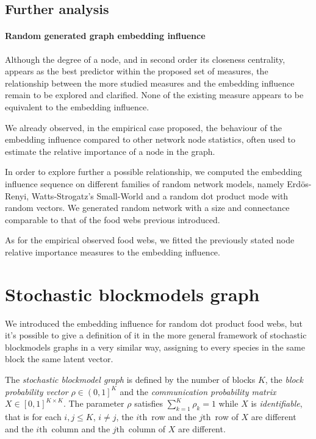 \documentclass[12pt]{article}
\theoremstyle{definition}
\begin{document}
\subsection{Further analysis}

\paragraph{Random generated graph embedding influence}
Although the degree of a node, and in second order its closeness centrality, appears as the best predictor within the proposed set of measures, the relationship between the more studied measures and the embedding influence remain to be explored and clarified. None of the existing measure appears to be equivalent to the embedding influence.

We already observed, in the empirical case proposed, the behaviour of the embedding influence compared to other network node statistics, often used to estimate the relative importance of a node in the graph.

In order to explore further a possible relationship, we computed the embedding influence sequence on different families of random network models, namely Erd\"{o}s-Renyi, Watts-Strogatz's Small-World and a random dot product mode with random vectors. We generated random network with a size and connectance comparable to that of the food webs previous introduced.

As for the empirical observed food webs, we fitted the previously stated node relative importance measures to the embedding influence.

\begin{small}


\end{small}

\newpage

\appendix

\section{Stochastic blockmodels graph}

We introduced the embedding influence for random dot product food webs, but it's possible to give a definition of it in the more general framework of stochastic blockmodels graphs in a very similar way, assigning to every species in the same block the same latent vector.

The {\em stochastic blockmodel graph} is defined by the number of blocks $K$, the {\em block probability vector} $\rho \in \left(0,1\right]^K$ and the {\em communication probability matrix} $X \in \left[0,1\right]^{K \times K}$. The parameter $\rho$ satisfies $\sum_{k=1}^K\rho_k = 1$ while $X$ is \emph{identifiable}, that is for each $i,j \leq K$, $i \neq j$, the $i\mbox{th}$~row and the $j\mbox{th}$~row of $X$ are different and the $i\mbox{th}$~column and the $j\mbox{th}$~column of $X$ are different.
\end{document}
